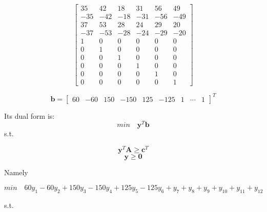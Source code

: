 \documentclass[12pt,a4paper]{article}
\theoremstyle{definition}
\begin{document}
\begin{enumerate}
\begin{enumerate}
\begin{equation*}
\begin{bmatrix}
                    35&42&18&31&56&49\\
                    -35&-42&-18&-31&-56&-49\\
                    37&53&28&24&29&20\\
                    -37&-53&-28&-24&-29&-20\\
                    1&0&0&0&0&0\\
                    0&1&0&0&0&0\\
                    0&0&1&0&0&0\\
                    0&0&0&1&0&0\\
                    0&0&0&0&1&0\\
                    0&0&0&0&0&1
                \end{bmatrix}
            \end{equation*}
            
            \begin{equation*}
                \mathbf{b}=
                \begin{bmatrix}
                    60&-60&150&-150&125&-125&1&\cdots&1
                \end{bmatrix}^T
            \end{equation*}
            
            Its dual form is:
            \begin{equation*}
                min\quad\mathbf{y}^T\mathbf{b}
            \end{equation*}
            s.t.
            
            \begin{equation*}
                \mathbf{y}^T\mathbf{A}\ge\mathbf{c}^T
            \end{equation*}
            \begin{equation*}
                \mathbf{y}\ge \mathbf{0}
            \end{equation*}
            
            Namely
            
            \begin{equation*}
                min\quad60y_1-60y_2+150y_3-150y_4+125y_5-125y_6+y_7+y_8+y_9+y_{10}+y_{11}+y_{12}
            \end{equation*}
            
            s.t.
            

\end{enumerate}
\end{enumerate}
\end{document}
